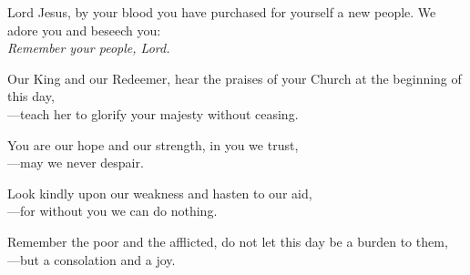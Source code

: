 \intercessions

\begin{raggedright}
Lord Jesus, by your blood you have purchased for yourself a new people. We adore you and beseech you:\\
\emph{Remember your people, Lord.}

\medskip
Our King and our Redeemer, hear the praises of your Church at the beginning of this day,\\
{\color{red}---}teach her to glorify your majesty without ceasing.

\medskip
You are our hope and our strength, in you we trust,\\
{\color{red}---}may we never despair.

\medskip
Look kindly upon our weakness and hasten to our aid,\\
{\color{red}---}for without you we can do nothing.

\medskip
Remember the poor and the afflicted, do not let this day be a burden to them,\\
{\color{red}---}but a consolation and a joy.
\end{raggedright}
